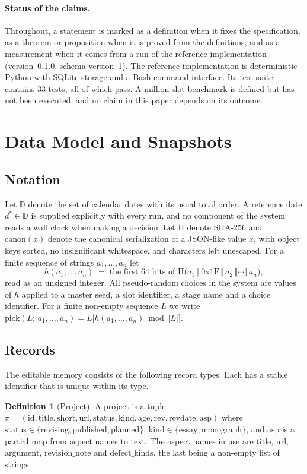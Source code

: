 \documentclass[11pt]{article}
\theoremstyle{definition}
\newtheorem{definition}[theorem]{Definition}
\theoremstyle{remark}
\newcommand{\Hash}{\mathrm{H}}
\newcommand{\canon}{\mathrm{canon}}
\begin{document}
\paragraph{Status of the claims.} Throughout, a statement is marked as a definition when it fixes the specification, as a theorem or proposition when it is proved from the definitions, and as a measurement when it comes from a run of the reference implementation (version~0.1.0, schema version~1). The reference implementation is deterministic Python with SQLite storage and a Bash command interface. Its test suite contains 33 tests, all of which pass. A million slot benchmark is defined but has not been executed, and no claim in this paper depends on its outcome.

\section{Data Model and Snapshots}\label{sec:model}

\subsection{Notation}

Let $\mathbb{D}$ denote the set of calendar dates with its usual total order. A reference date $d^\ast\in\mathbb{D}$ is supplied explicitly with every run, and no component of the system reads a wall clock when making a decision. Let $\Hash$ denote SHA-256 \cite{fips1804} and $\canon(x)$ denote the canonical serialization of a JSON-like value $x$, with object keys sorted, no insignificant whitespace, and characters left unescaped. For a finite sequence of strings $a_1,\dots,a_n$ let
\[
h(a_1,\dots,a_n)\;=\;\text{the first 64 bits of }\Hash\bigl(a_1\,\Vert\,\mathrm{0x1F}\,\Vert\,a_2\,\Vert\cdots\Vert\,a_n\bigr),
\]
read as an unsigned integer. All pseudo-random choices in the system are values of $h$ applied to a master seed, a slot identifier, a stage name and a choice identifier. For a finite non-empty sequence $L$ we write $\mathrm{pick}(L;\,a_1,\dots,a_n)=L\bigl[h(a_1,\dots,a_n)\bmod |L|\bigr]$.

\subsection{Records}

The editable memory consists of the following record types. Each has a stable identifier that is unique within its type.

\begin{definition}[Project]\label{def:project}
A project is a tuple $\pi=(\mathrm{id},\mathrm{title},\mathrm{short},\mathrm{url},\mathrm{status},\mathrm{kind},\mathrm{age},\mathrm{rev},\mathrm{revdate},\mathrm{asp})$ where $\mathrm{status}\in\{\text{revising},\text{published},\text{planned}\}$, $\mathrm{kind}\in\{\text{essay},\text{monograph}\}$, and $\mathrm{asp}$ is a partial map from aspect names to text. The aspect names in use are $\mathrm{title}$, $\mathrm{url}$, $\mathrm{argument}$, $\mathrm{revision\_note}$ and $\mathrm{defect\_kinds}$, the last being a non-empty list of strings.
\end{definition}
\end{document}
